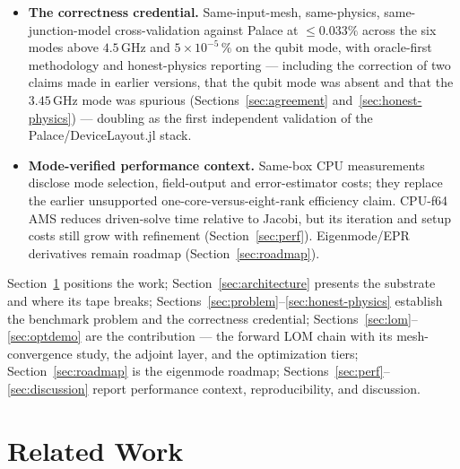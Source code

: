 \documentclass{anvil-paper}
\begin{document}
\begin{itemize}
    scalar-permittivity model, the committed 133k-tetrahedron mesh
    overstates $C_\Sigma$ by at least $54.69$\,fF, and the converged
    unmodified device lies below $83.02$\,fF. With the sapphire tensor
    that the lumped-element chain uses, the overstatement is at least
    $47.18$\,fF and the converged value lies below $89.50$\,fF. Both
    bounds are under the ${\sim}90$\,fF anchor, where earlier versions
    placed the device above it. Their ``model difference'' diagnosis is withdrawn,
    and the coarse-mesh optimizations that lowered $C_\Sigma$ toward the
    anchor are re-read as a cautionary precursor
    (Sections~\ref{sec:lom} and~\ref{sec:multiparam}).
  \item \textbf{The correctness credential.} Same-input-mesh,
    same-physics, same-junction-model cross-validation against Palace at
    $\leq 0.033\%$ across the six modes above $4.5$\,GHz and
    $5\times10^{-5}\,\%$ on the qubit mode, with oracle-first methodology
    and honest-physics reporting --- including the correction of two
    claims made in earlier versions, that the qubit mode was absent and
    that the $3.45$\,GHz mode was spurious
    (Sections~\ref{sec:agreement} and~\ref{sec:honest-physics}) ---
    doubling as the first independent validation of the
    Palace/DeviceLayout.jl stack.
  \item \textbf{Mode-verified performance context.} Same-box CPU
    measurements disclose mode selection, field-output and error-estimator
    costs; they replace the earlier unsupported one-core-versus-eight-rank
    efficiency claim. CPU-f64 AMS reduces driven-solve time relative to
    Jacobi, but its iteration and setup costs still grow with refinement
    (Section~\ref{sec:perf}). Eigenmode/EPR derivatives remain roadmap
    (Section~\ref{sec:roadmap}).
\end{itemize}

Section~\ref{sec:related} positions the work; Section~\ref{sec:architecture}
presents the substrate and where its tape breaks;
Sections~\ref{sec:problem}--\ref{sec:honest-physics} establish the
benchmark problem and the correctness credential;
Sections~\ref{sec:lom}--\ref{sec:optdemo} are the contribution ---
the forward LOM chain with its mesh-convergence study, the adjoint
layer, and the optimization tiers; Section~\ref{sec:roadmap} is the eigenmode roadmap;
Sections~\ref{sec:perf}--\ref{sec:discussion} report performance context,
reproducibility, and discussion.

\section{Related Work}
\label{sec:related}
\end{document}
